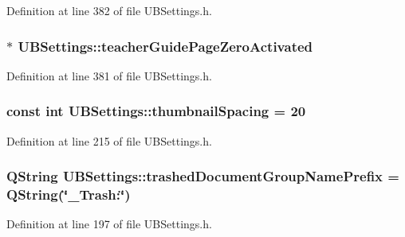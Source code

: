 Definition at line 382 of file U\-B\-Settings.\-h.

\hypertarget{class_u_b_settings_ac19853b7eb0ebe29c2f6146a8b92d031}{
\subsubsection[{teacher\-Guide\-Page\-Zero\-Activated}]{$\ast$ U\-B\-Settings\-::teacher\-Guide\-Page\-Zero\-Activated}}\label{db/d66/class_u_b_settings_ac19853b7eb0ebe29c2f6146a8b92d031}


Definition at line 381 of file U\-B\-Settings.\-h.

\hypertarget{class_u_b_settings_a75827aa0b1ea15cbfa77e1d4b2bf5ba3}{
\subsubsection[{thumbnail\-Spacing}]{\setlength{\rightskip}{0pt plus 5cm}const int U\-B\-Settings\-::thumbnail\-Spacing = 20\hspace{0.3cm}{\ttfamily [static]}}}\label{db/d66/class_u_b_settings_a75827aa0b1ea15cbfa77e1d4b2bf5ba3}


Definition at line 215 of file U\-B\-Settings.\-h.

\hypertarget{class_u_b_settings_a0e7fcd8a39b252af1670c0a099ad26cc}{
\subsubsection[{trashed\-Document\-Group\-Name\-Prefix}]{\setlength{\rightskip}{0pt plus 5cm}Q\-String U\-B\-Settings\-::trashed\-Document\-Group\-Name\-Prefix = Q\-String(\char`\"{}\-\_\-\-Trash\-:\char`\"{})\hspace{0.3cm}{\ttfamily [static]}}}\label{db/d66/class_u_b_settings_a0e7fcd8a39b252af1670c0a099ad26cc}


Definition at line 197 of file U\-B\-Settings.\-h.

